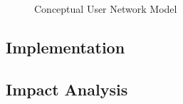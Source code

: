 \begin{figure}[H]
  \centering
  \caption{Conceptual User Network Model}
  \label{fig:social_network_conceptual}
\end{figure}

\subsection{Implementation}\label{sec:fa_social_network_implementation}

\subsection{Impact Analysis}\label{sec:fa_social_network_impact_analysis}

